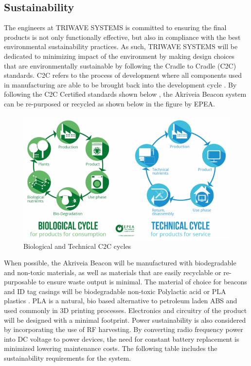 \break
\subsection{Sustainability}
The engineers at TRIWAVE SYSTEMS is committed to ensuring the final products is not only functionally effective, but also in compliance with the best environmental sustainability practices. As such, TRIWAVE SYSTEMS will be dedicated to minimizing impact of the environment by making design choices that are environmentally sustainable by following the Cradle to Cradle (\Gls{C2C}) standards. C2C refers to the process of development where all components used in manufacturing are able to be brought back into the development cycle \cite{R23}. By following the C2C Certified standards shown below \cite{R25}, the Akriveia Beacon system can be re-purposed or recycled as shown below in the figure by EPEA.

\begin{figure}[H]
\centering
    \includegraphics[scale=0.85]{./images/BioTechCycle.png}
    \caption{Biological and Technical C2C cycles}
\end{figure}

When possible, the Akriveia Beacon will be manufactured with biodegradable and non-toxic materials, as well as materials that are easily recyclable or re-purposable to ensure waste output is minimal. The material of choice for beacons and ID tag casings will be biodegradable non-toxic Polylactic acid or PLA plastics \cite{R25}. PLA is a natural, bio based alternative to petroleum laden ABS and used commonly in 3D printing processes. Electronics and circuitry of the product will be designed with a minimal footprint. Power sustainability is also considered by incorporating the use of RF harvesting. By converting radio frequency power into DC voltage to power devices, the need for constant battery replacement is minimized lowering maintenance costs. The following table includes the sustainability requirements for the system.

